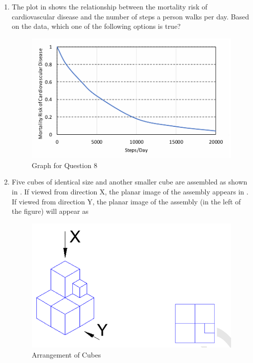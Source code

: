 \documentclass[journal,12pt,onecolumn]{IEEEtran}
\theoremstyle{remark}
\begin{document}
\begin{enumerate}
\item The plot in  shows the relationship between the mortality risk of cardiovascular disease and the number of steps a person walks per day. Based on the data, which one of the following options is true?
\par\hfill{}
\begin{figure}[H]
    \centering
    \includegraphics[width=0.5\columnwidth]{Figs/Q-8.png}
    \caption{Graph for Question 8}
    \label{8}
\end{figure}
    \begin{enumerate}
    \end{enumerate}

\item Five cubes of identical size and another smaller cube are assembled as shown in . If viewed from direction X, the planar image of the assembly appears in . If viewed from direction Y, the planar image of the assembly (in the left of the figure) will appear as
\par\hfill{}
\begin{figure}[H]
    \centering
    \includegraphics[width=0.5\linewidth]{Figs/Q-9.png}
    \caption{Arrangement of Cubes}
    \label{9}
\end{figure}


\end{enumerate}
\end{document}
